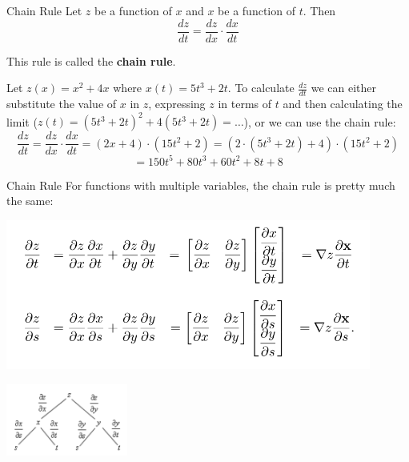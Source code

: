 \documentclass{beamer}
\begin{document}
\begin{frame}{Chain Rule}
Let $z$ be a function of $x$ and $x$ be a function of $t$. Then
$$\frac{dz}{dt} =\frac{dz}{dx}\cdot \frac{dx}{dt}
$$

\pause This rule is called the \textbf{chain rule}.

\pause
\begin{example}
    Let $z(x) = x^2 + 4x$ where $x(t) = 5t^3 + 2t$. \pause To calculate $\frac{dz}{dt} $ we can either substitute the value of $x$ in $z$, expressing $z$ in terms of $t$ and then calculating the limit ($z(t)=( 5t^3 + 2t)^2 + 4( 5t^3 + 2t) = \dots$), \pause or we can use the chain rule: 
\[\frac{dz}{dt} = \frac{dz}{dx} \cdot \frac{dx}{dt}= (2x+4)\cdot (15t^2+2)=(2\cdot (5t^3 + 2t)+4)\cdot (15t^2+2)\]\[=150 t^5 + 80 t^3 + 60 t^2 + 8 t + 8
        \]
    
\end{example}

\end{frame}


\begin{frame}{Chain Rule}
For functions with multiple variables, the chain rule is pretty much the same:
\pause
          \begin{center}

    \includegraphics[width=0.9\textwidth, height=\textheight, keepaspectratio]{chain.png}
  \end{center}
\pause
          \begin{center}

    \includegraphics[width=0.3\textwidth, height=\textheight, keepaspectratio]{chain21.png}
  \end{center}
\end{frame}
\end{document}
